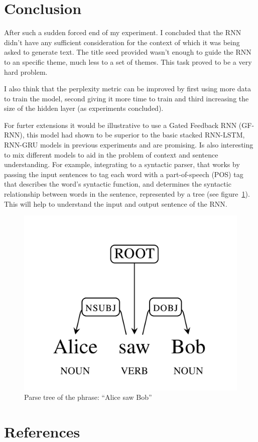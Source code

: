 \documentclass{article} %
\begin{document}
\section{Conclusion}
After such a sudden forced end of my experiment. I concluded that the RNN didn't
have any sufficient consideration for the context of which it was being asked to
generate text. The title seed provided wasn't enough to guide the RNN to an
specific theme, much less to a set of themes. This task proved to be a very hard
problem.

I also think that the perplexity metric can be improved by first using more
data to train the model, second giving it more time to train and third
increasing the size of the hidden layer (as experiments concluded).

For furter extensions it would be illustrative to use a Gated Feedback RNN (GF-RNN),
this model had shown to be superior to the basic stacked RNN-LSTM, RNN-GRU
models in previous experiments and are promising. Is also interesting to mix
different models to aid in the problem of context and sentence understanding.
For example, integrating to a syntactic parser, that works by passing the input
sentences to tag each word with a part-of-speech (POS) tag that describes the
word's syntactic function, and determines the syntactic relationship between
words in the sentence, represented by a tree (see figure~\ref{fig:parsetree}).
This will help to understand the input and output sentence of the RNN.

\begin{figure}[h]
\centering
\includegraphics[scale=0.1]{parse_tree}
\caption{Parse tree of the phrase: ``Alice saw Bob''}
\label{fig:parsetree}
\end{figure}


\section{References}
\end{document}
